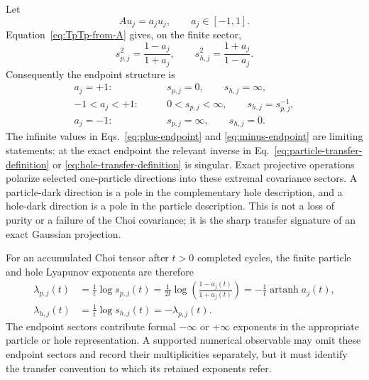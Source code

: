 \documentclass[aps,prb,onecolumn,nofootinbib,superscriptaddress]{revtex4-2}
\theoremstyle{plain}
\theoremstyle{definition}
\begin{document}
Let
\begin{equation}
  A u_j=a_j u_j,
  \qquad
  a_j\in[-1,1].
  \label{eq:A-eigenproblem}
\end{equation}
Equation~\eqref{eq:TpTp-from-A} gives, on the finite sector,
\begin{equation}
  s_{p,j}^2
  =
  \frac{1-a_j}{1+a_j},
  \qquad
  s_{h,j}^2
  =
  \frac{1+a_j}{1-a_j}.
  \label{eq:particle-hole-singular-from-A}
\end{equation}
Consequently the endpoint structure is
\begin{align}
  a_j=+1:
  &\qquad
  s_{p,j}=0,
  \qquad
  s_{h,j}=\infty,
  \label{eq:plus-endpoint}\\
  -1<a_j<+1:
  &\qquad
  0<s_{p,j}<\infty,
  \qquad
  s_{h,j}=s_{p,j}^{-1},
  \label{eq:interior-sector}\\
  a_j=-1:
  &\qquad
  s_{p,j}=\infty,
  \qquad
  s_{h,j}=0.
  \label{eq:minus-endpoint}
\end{align}
The infinite values in Eqs.~\eqref{eq:plus-endpoint} and
\eqref{eq:minus-endpoint} are limiting statements: at the exact endpoint
the relevant inverse in Eq.~\eqref{eq:particle-transfer-definition} or
\eqref{eq:hole-transfer-definition} is singular.  Exact projective
operations polarize selected one-particle directions into these extremal
covariance sectors.  A particle-dark direction is a pole in the
complementary hole description, and a hole-dark direction is a pole in the
particle description.  This is not a loss of purity or a failure of the
Choi covariance; it is the sharp transfer signature of an exact Gaussian
projection.

For an accumulated Choi tensor after \(t>0\) completed cycles, the finite
particle and hole Lyapunov exponents are therefore
\begin{align}
  \lambda_{p,j}(t)
  &=
  \frac{1}{t}\log s_{p,j}(t)
  =
  \frac{1}{2t}
  \log\!\left(\frac{1-a_j(t)}{1+a_j(t)}\right)
  =
  -\frac{1}{t}\operatorname{artanh}a_j(t),
  \label{eq:particle-lyapunov-from-A}\\
  \lambda_{h,j}(t)
  &=
  \frac{1}{t}\log s_{h,j}(t)
  =
  -\lambda_{p,j}(t).
  \label{eq:hole-lyapunov-from-A}
\end{align}
The endpoint sectors contribute formal \(-\infty\) or \(+\infty\)
exponents in the appropriate particle or hole representation.  A supported
numerical observable may omit these endpoint sectors and record their
multiplicities separately, but it must identify the transfer convention to
which its retained exponents refer.
\end{document}
